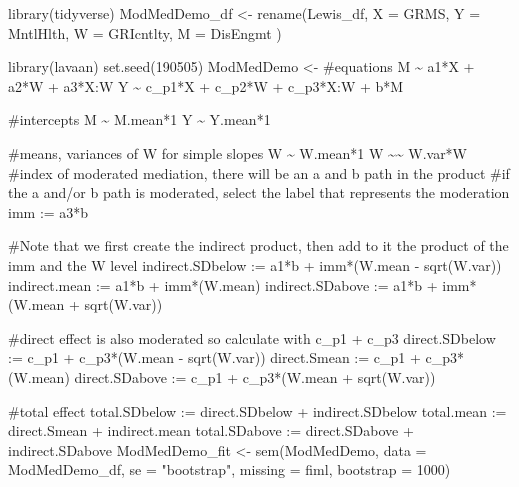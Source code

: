 \documentclass[
  english,
]{book}
\newenvironment{Shaded}{\begin{snugshade}}{\end{snugshade}}
\newcommand{\AttributeTok}[1]{\textcolor[rgb]{0.77,0.63,0.00}{#1}}
\newcommand{\DecValTok}[1]{\textcolor[rgb]{0.00,0.00,0.81}{#1}}
\newcommand{\FunctionTok}[1]{\textcolor[rgb]{0.00,0.00,0.00}{#1}}
\newcommand{\NormalTok}[1]{#1}
\newcommand{\OtherTok}[1]{\textcolor[rgb]{0.56,0.35,0.01}{#1}}
\newcommand{\StringTok}[1]{\textcolor[rgb]{0.31,0.60,0.02}{#1}}
\begin{document}
\begin{Shaded}
\begin{Highlighting}[]
\FunctionTok{library}\NormalTok{(tidyverse)}
\NormalTok{ModMedDemo\_df }\OtherTok{\textless{}{-}} \FunctionTok{rename}\NormalTok{(Lewis\_df, }\AttributeTok{X =}\NormalTok{ GRMS, }\AttributeTok{Y =}\NormalTok{ MntlHlth, }\AttributeTok{W =}\NormalTok{ GRIcntlty, }\AttributeTok{M =}\NormalTok{ DisEngmt )}
\end{Highlighting}
\end{Shaded}

\begin{Shaded}
\begin{Highlighting}[]
\FunctionTok{library}\NormalTok{(lavaan)}
\FunctionTok{set.seed}\NormalTok{(}\DecValTok{190505}\NormalTok{)}
\NormalTok{ModMedDemo }\OtherTok{\textless{}{-}} \StringTok{\textquotesingle{}}
\StringTok{    \#equations}
\StringTok{    M \textasciitilde{} a1*X + a2*W + a3*X:W}
\StringTok{    Y \textasciitilde{} c\_p1*X + c\_p2*W + c\_p3*X:W + b*M}

\StringTok{    \#intercepts}
\StringTok{    M \textasciitilde{} M.mean*1}
\StringTok{    Y \textasciitilde{} Y.mean*1}

\StringTok{    \#means, variances of W for simple slopes}
\StringTok{    W \textasciitilde{} W.mean*1}
\StringTok{    W \textasciitilde{}\textasciitilde{} W.var*W}
\StringTok{    }
\StringTok{    \#index of moderated mediation, there will be an a and b path in the product}
\StringTok{    \#if the a and/or b path is moderated, select the label that represents the moderation}
\StringTok{    imm := a3*b}

\StringTok{    \#Note that we first create the indirect product, then add to it the product of the imm and the W level}
\StringTok{    indirect.SDbelow := a1*b + imm*(W.mean {-} sqrt(W.var))}
\StringTok{    indirect.mean := a1*b + imm*(W.mean)}
\StringTok{    indirect.SDabove := a1*b + imm*(W.mean + sqrt(W.var))}

\StringTok{    \#direct effect is also moderated so calculate with c\_p1 + c\_p3}
\StringTok{    direct.SDbelow := c\_p1 + c\_p3*(W.mean {-} sqrt(W.var)) }
\StringTok{    direct.Smean := c\_p1 + c\_p3*(W.mean)}
\StringTok{    direct.SDabove := c\_p1 + c\_p3*(W.mean + sqrt(W.var))}

\StringTok{    \#total effect}
\StringTok{    total.SDbelow := direct.SDbelow + indirect.SDbelow}
\StringTok{    total.mean := direct.Smean + indirect.mean}
\StringTok{    total.SDabove := direct.SDabove + indirect.SDabove}
\StringTok{ \textquotesingle{}}
\NormalTok{ModMedDemo\_fit }\OtherTok{\textless{}{-}} \FunctionTok{sem}\NormalTok{(ModMedDemo, }\AttributeTok{data =}\NormalTok{ ModMedDemo\_df, }\AttributeTok{se =} \StringTok{"bootstrap"}\NormalTok{, }\AttributeTok{missing =} \StringTok{\textquotesingle{}fiml\textquotesingle{}}\NormalTok{, }\AttributeTok{bootstrap =} \DecValTok{1000}\NormalTok{)}
\end{Highlighting}
\end{Shaded}
\end{document}
